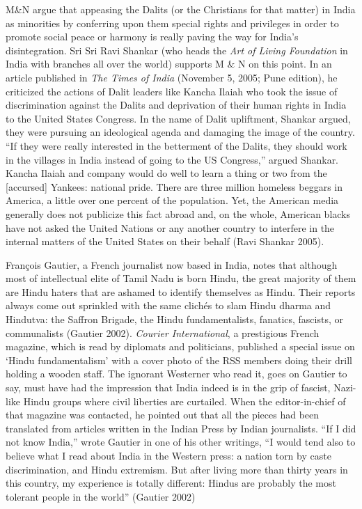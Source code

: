 M\&N argue that appeasing the Dalits (or the Christians for that matter) in India as minorities by conferring upon them special rights and privileges in order to promote social peace or harmony is really paving the way for India’s disintegration. Sri Sri Ravi Shankar (who heads the \textit{Art of Living Foundation} in India with branches all over the world) supports M \& N on this point. In an article published in \textit{The Times of India} (November 5, 2005; Pune edition), he criticized the actions of Dalit leaders like Kancha Ilaiah who took the issue of discrimination against the Dalits and deprivation of their human rights in India to the United States Congress. In the name of Dalit upliftment, Shankar argued, they were pursuing an ideological agenda and damaging the image of the country. “If they were really interested in the betterment of the Dalits, they should work in the villages in India instead of going to the US Congress,” argued Shankar. Kancha Ilaiah and company would do well to learn a thing or two from the [accursed] Yankees: national pride. There are three million homeless beggars in America, a little over one percent of the population. Yet, the American media generally does not publicize this fact abroad and, on the whole, American blacks have not asked the United Nations or any another country to interfere in the internal matters of the United States on their behalf (Ravi Shankar 2005).

François Gautier, a French journalist now based in India, notes that although most of intellectual elite of Tamil Nadu is born Hindu, the great majority of them are Hindu haters that are ashamed to identify themselves as Hindu. Their reports always come out sprinkled with the same clichés to slam Hindu dharma and Hindutva: the Saffron Brigade, the Hindu fundamentalists, fanatics, fascists, or communalists (Gautier 2002). \textit{Courier International}, a prestigious French magazine, which is read by diplomats and politicians, published a special issue on ‘Hindu fundamentalism’ with a cover photo of the RSS members doing their drill holding a wooden staff. The ignorant Westerner who read it, goes on Gautier to say, must have had the impression that India indeed is in the grip of fascist, Nazi-like Hindu groups where civil liberties are curtailed. When the editor-in-chief of that magazine was contacted, he pointed out that all the pieces had been translated from articles written in the Indian Press by Indian journalists. “If I did not know India,” wrote Gautier in one of his other writings, “I would tend also to believe what I read about India in the Western press: a nation torn by caste discrimination, and Hindu extremism. But after living more than thirty years in this country, my experience is totally different: Hindus are probably the most tolerant people in the world” (Gautier 2002)



